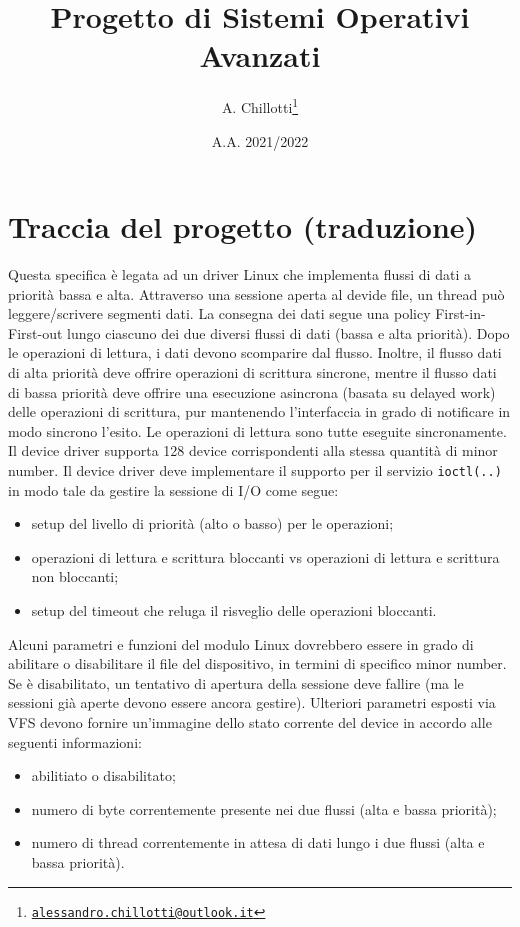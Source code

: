 \documentclass[oneside]{article}
\title{Progetto di Sistemi Operativi Avanzati}
\date{A.A. 2021/2022}
\author{A. Chillotti\thanks{\texttt{\href{mailto:alessandro.chillotti@outlook.it}{alessandro.chillotti@outlook.it}}}}
\begin{document}
\maketitle

\section{Traccia del progetto (traduzione)}
Questa specifica è legata ad un driver Linux che implementa flussi di dati a priorità bassa e alta. Attraverso una sessione aperta al devide file, un thread può leggere/scrivere segmenti dati. La consegna dei dati segue una policy First-in-First-out lungo ciascuno dei due diversi flussi di dati (bassa e alta priorità). Dopo le operazioni di lettura, i dati devono scomparire dal flusso. Inoltre, il flusso dati di alta priorità deve offrire operazioni di scrittura sincrone, mentre il flusso dati di bassa priorità deve offrire una esecuzione asincrona (basata su delayed work) delle operazioni di scrittura, pur mantenendo l'interfaccia in grado di notificare in modo sincrono l'esito. Le operazioni di lettura sono tutte eseguite sincronamente. Il device driver supporta 128 device corrispondenti alla stessa quantità di minor number. Il device driver deve implementare il supporto per il servizio \texttt{ioctl(..)} in modo tale da gestire la sessione di I/O come segue:
\begin{itemize}
\item setup del livello di priorità (alto o basso) per le operazioni;
\item operazioni di lettura e scrittura bloccanti vs operazioni di lettura e scrittura non bloccanti;
\item setup del timeout che reluga il risveglio delle operazioni bloccanti.
\end{itemize}
Alcuni parametri e funzioni del modulo Linux dovrebbero essere in grado di abilitare o disabilitare il file del dispositivo, in termini di specifico minor number. Se è disabilitato, un tentativo di apertura della sessione deve fallire (ma le sessioni già aperte devono essere ancora gestire). Ulteriori parametri esposti via VFS devono fornire un'immagine dello stato corrente del device in accordo alle seguenti informazioni:
\begin{itemize}
\item abilitiato o disabilitato;
\item numero di byte correntemente presente nei due flussi (alta e bassa priorità);
\item numero di thread correntemente in attesa di dati lungo i due flussi (alta e bassa priorità).
\end{itemize}
\end{document}
